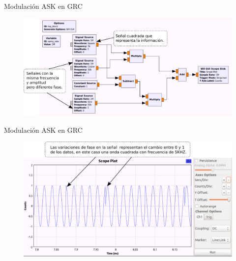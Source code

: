 \begin{frame}{Modulación ASK en GRC}
\begin{figure}[H]
\centering
\includegraphics[width=\textwidth]{parte1/lab4/pdf/lab4_8.pdf}
\end{figure}
\end{frame}
\begin{frame}{Modulación ASK en GRC}
\begin{figure}[H]
\centering
\includegraphics[width=\textwidth]{parte1/lab4/pdf/lab4_9.pdf}
\end{figure}
\end{frame}
 

